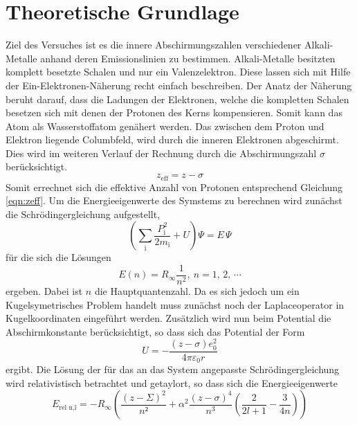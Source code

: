 \section{Theoretische Grundlage}
\label{sec:Theorie}
Ziel des Versuches ist es die innere Abschirmungszahlen verschiedener Alkali-Metalle anhand deren Emissionslinien zu bestimmen.
Alkali-Metalle besitzten komplett besetzte Schalen und nur ein Valenzelektron. Diese lassen sich mit Hilfe der Ein-Elektronen-Näherung recht einfach beschreiben. Der Anatz der Näherung beruht darauf, dass die Ladungen der Elektronen, welche die kompletten Schalen besetzen sich mit denen der Protonen des Kerns kompensieren. Somit kann das Atom als Wasserstoffatom genähert werden. Das zwischen dem Proton und Elektron liegende Columbfeld, wird durch die inneren Elektronen abgeschirmt. Dies wird im weiteren Verlauf der Rechnung durch die Abschirmungszahl $\sigma$ berücksichtigt.
\begin{equation}
  z_\text{eff} = z - \sigma
  \label{eqn:zeff}
\end{equation}
Somit errechnet sich die effektive Anzahl von Protonen entsprechend Gleichung \eqref{eqn:zeff}.
Um die Energieeigenwerte des Symstems zu berechnen wird zunächst die Schrödingergleichung aufgestellt,
\begin{equation}
  \left( \sum_\text{i} \frac{P_\text{i}^2}{2 m_\text{i}} + U \right) \Psi = E\, \Psi
  \label{eqn:Sch}
\end{equation}
für die sich die Lösungen
\begin{equation}
  E(n) = R_{\infty} \frac{1}{n^2}, \ n = 1, \, 2, \, \cdots
  \label{eqn:En}
\end{equation}
ergeben. Dabei ist $n$ die Hauptquantenzahl. Da es sich jedoch um ein Kugelsymetrisches Problem handelt muss zunächst noch der Laplaceoperator in Kugelkoordinaten eingeführt werden. Zusätzlich wird nun beim Potential die Abschirmkonstante berücksichtigt, so dass sich das Potential der Form
\begin{equation}
  U = - \frac{\left( z - \sigma \right) e_0^2}{4 \pi  \varepsilon_0 r}
  \label{schrö}
\end{equation}
ergibt. Die Lösung der für das an das System angepasste Schrödingergleichung wird relativistisch betrachtet und getaylort, so dass sich die Energieeigenwerte
\begin{equation}
  E_\text{rel n,l} = -R_{\infty} \left( \frac{(z - \Sigma)^2}{n²} + \alpha^2 \frac{(z - \sigma)^4}{n^3}\left( \frac{2}{2 l +1} - \frac{3}{4n} \right) \right)
  \label{eqn:ham}
\end{equation}
